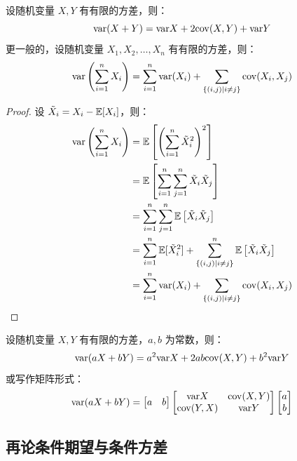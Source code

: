 \begin{theorem}[随机变量和的方差]
设随机变量 $X,Y$ 有有限的方差，则：
\[\mathrm{var}(X+Y)=\mathrm{var} X+2\mathrm{cov}(X,Y)+\mathrm{var} Y\]
更一般的，设随机变量 $X_1,X_2,\ldots,X_n$ 有有限的方差，则：
\[
\mathrm{var}\left(\sum_{i=1}^n X_i\right)=\sum_{i=1}^n\mathrm{var}(X_i)+\sum_{\{(i,j)\mid i\neq j\}}\mathrm{cov}(X_i,X_j)
\]
\end{theorem}
\begin{proof}
设 $\tilde X_i=X_i-\mathbb{E}[X_i]$，则：
\begin{align*}
\mathrm{var}\left(\sum_{i=1}^n X_i\right)&=\mathbb{E}\left[\left(\sum_{i=1}^n{\tilde X_i}^2\right)^2\right]\\
&=\mathbb{E}\left[\sum_{i=1}^n\sum_{j=1}^n\tilde X_i\tilde X_j\right]\\
&=\sum_{i=1}^n\sum_{j=1}^n\mathbb{E}\left[\tilde X_i\tilde X_j\right]\\
&=\sum_{i=1}^n\mathbb{E}[{\tilde X_i}^2]+\sum_{\{(i,j)\mid i\neq j\}}^n\mathbb{E}\left[\tilde X_i\tilde X_j\right]\\
&=\sum_{i=1}^n\mathrm{var}(X_i)+\sum_{\{(i,j)\mid i\neq j\}}\mathrm{cov}(X_i,X_j)
\end{align*}
\end{proof}

\begin{corollary}
设随机变量 $X,Y$ 有有限的方差，$a,b$ 为常数，则：
\[
\mathrm{var}(aX+bY)=a^2\mathrm{var} X+2ab\mathrm{cov}(X,Y)+b^2\mathrm{var} Y
\]
或写作矩阵形式：
\[
\mathrm{var}(aX+bY)=\begin{bmatrix}a&b\end{bmatrix}\begin{bmatrix}\mathrm{var} X&\mathrm{cov}(X,Y)\\\mathrm{cov}(Y,X)&\mathrm{var} Y\end{bmatrix}\begin{bmatrix}a\\b\end{bmatrix}
\]
\end{corollary}


\subsection{再论条件期望与条件方差}
\label{sec:cond-e-cond-var}


